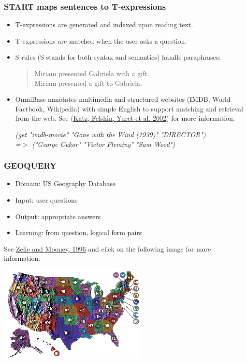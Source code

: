 \documentclass[ignorenonframetext]{beamer}
\begin{document}
\begin{frame}\frametitle{START maps sentences to T-expressions}
\begin{itemize}
\item T-expressions are generated and indexed upon reading text.
\item T-expressions are matched when the user asks a question.
\item S-rules (S stands for both syntax and semantics) handle paraphrases:
\begin{quote}
Miriam presented Gabriela with a gift.\\
Miriam presented a gift to Gabriela.
\end{quote}
\item OmniBase annotates multimedia and structured websites (IMDB,
  World Factbook, Wikipedia) with simple English to support matching
  and retrieval from the web.  See
  (\href{http://www.denizyuret.com/pub/nldb02/Katz-etal-NLDB02.pdf}{Katz,
    Felshin, Yuret et al. 2002}) for more information.
\vspace*{1em}

{\small\sl
(get "imdb-movie" "Gone with the Wind (1939)" "DIRECTOR") 
\\ =$>$ ("George Cukor" "Victor Fleming" "Sam Wood")
}
\end{itemize}
\end{frame}

\begin{frame}\frametitle{GEOQUERY}

\begin{itemize}
\item Domain: US Geography Database
\item Input: user questions
\item Output: appropriate answers
\item Learning: from question, logical form pairs
\end{itemize}

See \href{http://aaaipress.org/Papers/AAAI/1996/AAAI96-156.pdf}{Zelle
  and Mooney, 1996}
and click on the following image for more information.

\begin{center}
\href{http://www.cs.utexas.edu/users/ml/geo.html}{
\includegraphics[width=.7\textwidth]{images/us-states.png}}
\end{center}

\end{frame}
\end{document}
